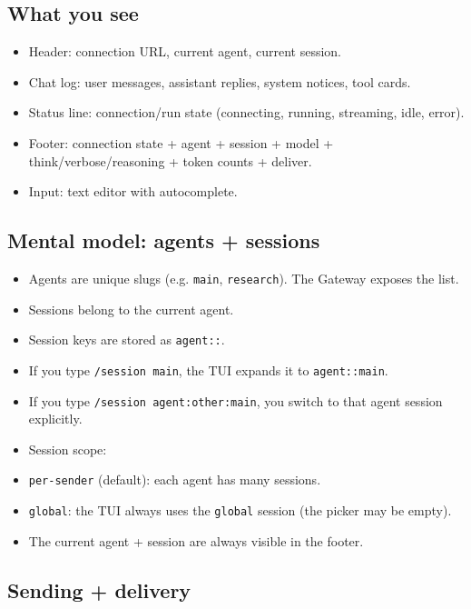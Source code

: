 \subsection{What you see}


\begin{itemize}
  \item Header: connection URL, current agent, current session.
  \item Chat log: user messages, assistant replies, system notices, tool cards.
  \item Status line: connection/run state (connecting, running, streaming, idle, error).
  \item Footer: connection state + agent + session + model + think/verbose/reasoning + token counts + deliver.
  \item Input: text editor with autocomplete.
\end{itemize}


\subsection{Mental model: agents + sessions}


\begin{itemize}
  \item Agents are unique slugs (e.g. \texttt{main}, \texttt{research}). The Gateway exposes the list.
  \item Sessions belong to the current agent.
  \item Session keys are stored as \texttt{agent::}.
  \item If you type \texttt{/session main}, the TUI expands it to \texttt{agent::main}.
  \item If you type \texttt{/session agent:other:main}, you switch to that agent session explicitly.
  \item Session scope:
  \item \texttt{per-sender} (default): each agent has many sessions.
  \item \texttt{global}: the TUI always uses the \texttt{global} session (the picker may be empty).
  \item The current agent + session are always visible in the footer.
\end{itemize}


\subsection{Sending + delivery}


